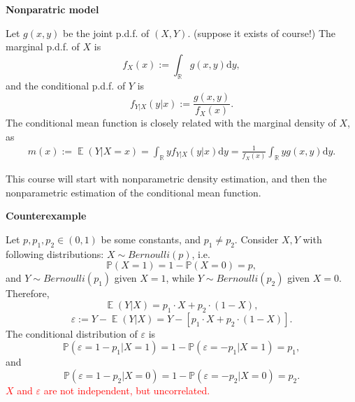 \documentclass[19pt,landscaoe]{article}
\newcommand{\IP}{\mathbb{P}}
\DeclareMathOperator{\E}{\mathbb{E}}
\newcommand{\R}{\mathbb{R}}
\begin{document}
\newpage
{\LARGE{\textbf{Nonparatric model}}}
\vskip15pt
\begin{minipage}{.9\textwidth}
    \Large 
Let $g(x,y)$ be the joint p.d.f. of $(X,Y)$. (suppose it exists of course!) The marginal p.d.f. of $X$ is 
$$f_X(x):=\int_{\R}g(x,y)\mathrm{d}y,$$
and the conditional p.d.f. of $Y$ is 
$$f_{Y|X}(y|x):=\frac{g(x,y)}{f_X(x)}.$$
The conditional mean function is closely related with the marginal density of $X$, as 
\begin{eqnarray*}
    m(x):=\E(Y|X=x)=\int_{\R}yf_{Y|X}(y|x)\mathrm{d}y=\frac1{f_X(x)}\int_{\R}yg(x,y)\mathrm{d}y.
\end{eqnarray*}

This course will start with nonparametric density estimation, and then the nonparametric estimation of the conditional mean function. 
\end{minipage}




\newpage
{\LARGE\centerline{\textbf{Counterexample}}}
\vskip25pt
\begin{minipage}{.9\textwidth}
    \Large 
    Let $p,p_1,p_2\in(0,1)$ be some constants, and $p_1\ne p_2$. Consider $X,Y$ with following distributions: 
$X\sim Bernoulli(p)$, i.e. 
$$\IP(X=1)=1-\IP(X=0)=p,$$
and $Y\sim Bernoulli(p_1)$ given $X=1$, while $Y\sim Bernoulli(p_2)$ given $X=0$. Therefore, 
$$\E(Y|X)=p_1\cdot X+p_2\cdot(1-X),$$
$$\varepsilon:=Y-\E(Y|X)=Y-[p_1\cdot X+p_2\cdot(1-X)].$$
The conditional distribution of $\varepsilon$ is
$$\IP(\varepsilon=1-p_1|X=1)=1-\IP(\varepsilon=-p_1|X=1)=p_1,$$
and  
$$\IP(\varepsilon=1-p_2|X=0)=1-\IP(\varepsilon=-p_2|X=0)=p_2.$$
\textcolor{red}{$X$ and $\varepsilon$ are not independent, but uncorrelated.}
\end{minipage}
\end{document}
